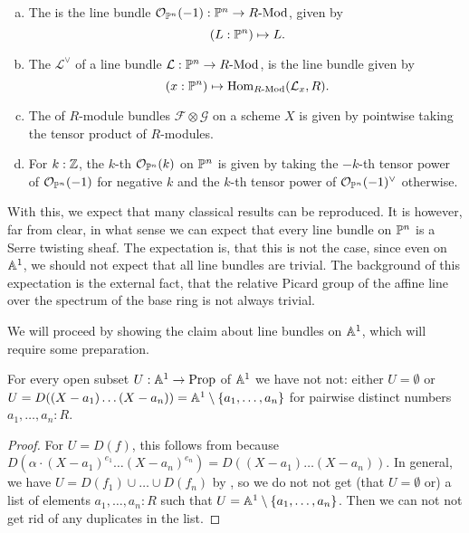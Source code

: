 \begin{definition}
  \begin{enumerate}[(a)]
  \item The  is the line bundle $\mathcal O_{\mathbb{P}^n}(-1):\mathbb{P}^n\to R\text{-}\mathrm{Mod}$,
    given by
    \[ (L:\bP^n)\mapsto L\rlap{.}\]
  \item The  $\mathcal L^\vee$ of a line bundle $\mathcal L:\mathbb{P}^n\to R\text{-}\mathrm{Mod}$,
    is the line bundle given by
    \[ (x:\bP^n)\mapsto \Hom_{\Mod{R}}(\mathcal L_x,R)\rlap{.}\]
  \item The  of $R$-module bundles $\mathcal F\otimes \mathcal G$
    on a scheme $X$
    is given by pointwise taking the tensor product of $R$-modules.
  \item For $k:\mathbb{Z}$, the $k$-th  $\mathcal{O}_{\mathbb{P}^n}(k)$ on $\mathbb{P}^n$
    is given by taking the $-k$-th tensor power of $\mathcal O_{\mathbb{P}^n}(-1)$ for negative $k$
    and the $k$-th tensor power of $\mathcal O_{\mathbb{P}^n}(-1)^{\vee}$ otherwise.
  \end{enumerate}
\end{definition}

With this, we expect that many classical results can be reproduced.
It is however, far from clear, in what sense we can expect that every line bundle on $\mathbb{P}^n$
is a Serre twisting sheaf.
The expectation is, that this is not the case,
since even on $\mathbb{A}^1$, we should not expect that all line bundles are trivial.
The background of this expectation is the external fact, that the relative Picard group of
the affine line over the spectrum of the base ring is not always trivial.

We will proceed by showing the claim about line bundles on $\mathbb{A}^1$,
which will require some preparation.

\begin{lemma}
  For every open subset $U : \mathbb{A}^1 \to \mathrm{Prop}$ of $\mathbb{A}^1$
  we have not not:
  either $U = \emptyset$
  or $U = D((X - a_1)\dots(X - a_n)) = \mathbb{A}^1 \setminus \{ a_1, \dots, a_n \}$
  for pairwise distinct numbers $a_1, \dots, a_n : R$.
\end{lemma}

\begin{proof}
  For $U = D(f)$,
  this follows from 
  because $D(\alpha \cdot {(X - a_1)}^{e_1} \dots {(X - a_n)}^{e_n})
  = D((X - a_1) \dots (X - a_n))$.
  In general,
  we have $U = D(f_1) \cup \dots \cup D(f_n)$
  by ,
  so we do not not get
  (that $U = \emptyset$ or)
  a list of elements $a_1, \dots, a_n : R$
  such that $U = \mathbb{A}^1 \setminus \{ a_1, \dots, a_n \}$.
  Then we can not not get rid of any duplicates in the list.
\end{proof}

